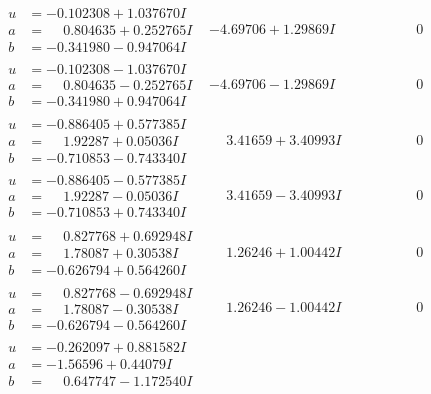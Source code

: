 \documentclass[1p]{elsarticle_modified}
\theoremstyle{definition}
\begin{document}
$$\begin{array}{c|c|c}
\begin{aligned}
u &= -0.102308 + 1.037670 I \\
a &= \phantom{-}0.804635 + 0.252765 I \\
b &= -0.341980 - 0.947064 I\end{aligned}
 & -4.69706 + 1.29869 I & \phantom{-0.000000 } 0 \\ \hline\begin{aligned}
u &= -0.102308 - 1.037670 I \\
a &= \phantom{-}0.804635 - 0.252765 I \\
b &= -0.341980 + 0.947064 I\end{aligned}
 & -4.69706 - 1.29869 I & \phantom{-0.000000 } 0 \\ \hline\begin{aligned}
u &= -0.886405 + 0.577385 I \\
a &= \phantom{-}1.92287 + 0.05036 I \\
b &= -0.710853 - 0.743340 I\end{aligned}
 & \phantom{-}3.41659 + 3.40993 I & \phantom{-0.000000 } 0 \\ \hline\begin{aligned}
u &= -0.886405 - 0.577385 I \\
a &= \phantom{-}1.92287 - 0.05036 I \\
b &= -0.710853 + 0.743340 I\end{aligned}
 & \phantom{-}3.41659 - 3.40993 I & \phantom{-0.000000 } 0 \\ \hline\begin{aligned}
u &= \phantom{-}0.827768 + 0.692948 I \\
a &= \phantom{-}1.78087 + 0.30538 I \\
b &= -0.626794 + 0.564260 I\end{aligned}
 & \phantom{-}1.26246 + 1.00442 I & \phantom{-0.000000 } 0 \\ \hline\begin{aligned}
u &= \phantom{-}0.827768 - 0.692948 I \\
a &= \phantom{-}1.78087 - 0.30538 I \\
b &= -0.626794 - 0.564260 I\end{aligned}
 & \phantom{-}1.26246 - 1.00442 I & \phantom{-0.000000 } 0 \\ \hline\begin{aligned}
u &= -0.262097 + 0.881582 I \\
a &= -1.56596 + 0.44079 I \\
b &= \phantom{-}0.647747 - 1.172540 I\end{aligned}

\end{array}$$
\end{document}
